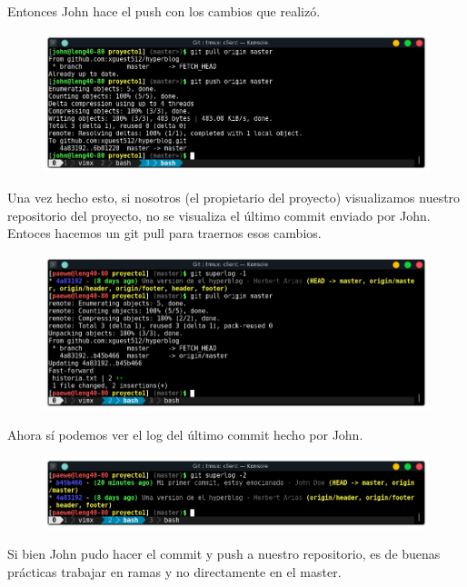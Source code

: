 \documentclass{article}
\begin{document}
\newpage
Entonces John hace el push con los cambios que realizó.

\begin{figure}[h!]
  \centering
  \includegraphics[scale=0.75]{./Pictures/269_push_anita.png}
\end{figure}

Una vez hecho esto, si nosotros (el propietario del proyecto) visualizamos
nuestro repositorio del proyecto, no se visualiza el último commit enviado por
John. Entoces hacemos un git pull para traernos esos cambios.

\begin{figure}[h!]
  \centering
  \includegraphics[scale=0.75]{./Pictures/270_paewe_pull.png}
\end{figure}

Ahora sí podemos ver el log del último commit hecho por John.

\begin{figure}[h!]
  \centering
  \includegraphics[scale=0.75]{./Pictures/271_paewe_log.png}
\end{figure}

Si bien John pudo hacer el commit y push a nuestro repositorio, es de buenas
prácticas trabajar en ramas y no directamente en el master.
\end{document}

